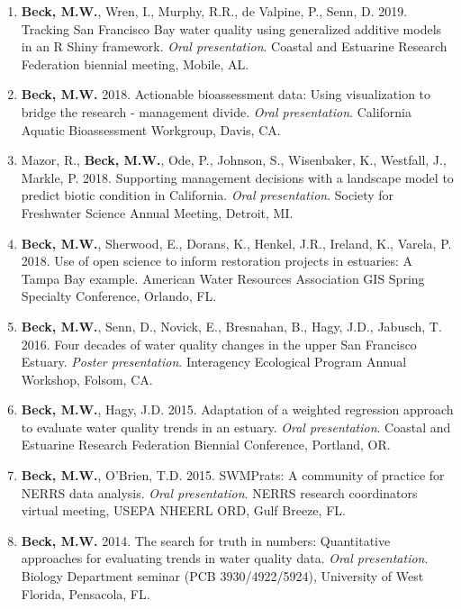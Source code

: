 \documentclass[letterpaper,12pt]{article}
\begin{document}
\begin{enumerate}
\item {\bf Beck, M.W.}, Wren, I., Murphy, R.R., de Valpine, P., Senn, D. 2019. Tracking San Francisco Bay water quality using generalized additive models in an R Shiny framework. \textit{Oral presentation}. Coastal and Estuarine Research Federation biennial meeting, Mobile, AL.

\item {\bf Beck, M.W.} 2018. Actionable bioassessment data: Using visualization to bridge the research - management divide. \textit{Oral presentation}. California Aquatic Bioassessment Workgroup, Davis, CA.

\item Mazor, R., {\bf Beck, M.W.}, Ode, P., Johnson, S., Wisenbaker, K., Westfall, J., Markle, P. 2018. Supporting management decisions with a landscape model to predict biotic condition in California. \textit{Oral presentation}. Society for Freshwater Science Annual Meeting, Detroit, MI.

\item {\bf Beck, M.W.}, Sherwood, E., Dorans, K., Henkel, J.R., Ireland, K., Varela, P. 2018. Use of open science to inform restoration projects in estuaries: A Tampa Bay example. American Water Resources Association GIS Spring Specialty Conference, Orlando, FL. 

\item {\bf Beck, M.W.}, Senn, D., Novick, E., Bresnahan, B., Hagy, J.D., Jabusch, T. 2016. Four decades of water quality changes in the upper San Francisco Estuary. \textit{Poster presentation}. Interagency Ecological Program Annual Workshop, Folsom, CA.

\item {\bf Beck, M.W.}, Hagy, J.D. 2015. Adaptation of a weighted regression approach to evaluate water quality trends in an estuary. \textit{Oral presentation}. Coastal and Estuarine Research Federation Biennial Conference, Portland, OR.

\item {\bf Beck, M.W.}, O'Brien, T.D. 2015. SWMPrats: A community of practice for NERRS data analysis. \textit{Oral presentation}. NERRS research coordinators virtual meeting, USEPA NHEERL ORD, Gulf Breeze, FL.

\item {\bf Beck, M.W.} 2014. The search for truth in numbers: Quantitative approaches for evaluating trends in water quality data. \textit{Oral presentation}. Biology Department seminar (PCB 3930/4922/5924), University of West Florida, Pensacola, FL. 


\end{enumerate}
\end{document}

